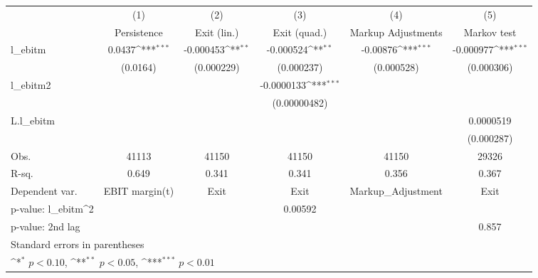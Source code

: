 {
\def\sym#1{\ifmmode^{#1}\else\(^{#1}\)\fi}
\begin{tabular}{l*{5}{c}}
\toprule
                    &\multicolumn{1}{c}{(1)}&\multicolumn{1}{c}{(2)}&\multicolumn{1}{c}{(3)}&\multicolumn{1}{c}{(4)}&\multicolumn{1}{c}{(5)}\\
                    &\multicolumn{1}{c}{Persistence}&\multicolumn{1}{c}{Exit (lin.)}&\multicolumn{1}{c}{Exit (quad.)}&\multicolumn{1}{c}{Markup Adjustments}&\multicolumn{1}{c}{Markov test}\\
\midrule
l\_ebitm             &      0.0437\sym{***}&   -0.000453\sym{**} &   -0.000524\sym{**} &    -0.00876\sym{***}&   -0.000977\sym{***}\\
                    &    (0.0164)         &  (0.000229)         &  (0.000237)         &  (0.000528)         &  (0.000306)         \\
\addlinespace
l\_ebitm2            &                     &                     &  -0.0000133\sym{***}&                     &                     \\
                    &                     &                     &(0.00000482)         &                     &                     \\
\addlinespace
L.l\_ebitm           &                     &                     &                     &                     &   0.0000519         \\
                    &                     &                     &                     &                     &  (0.000287)         \\
\midrule
Obs.                &       41113         &       41150         &       41150         &       41150         &       29326         \\
R-sq.               &       0.649         &       0.341         &       0.341         &       0.356         &       0.367         \\
Dependent var.      &EBIT margin(t)         &        Exit         &        Exit         &Markup\_Adjustment         &        Exit         \\
p-value: l\_ebitm^2  &                     &                     &     0.00592         &                     &                     \\
p-value: 2nd lag    &                     &                     &                     &                     &       0.857         \\
\bottomrule
\multicolumn{6}{l}{\footnotesize Standard errors in parentheses}\\
\multicolumn{6}{l}{\footnotesize \sym{*} \(p<0.10\), \sym{**} \(p<0.05\), \sym{***} \(p<0.01\)}\\
\end{tabular}
}
